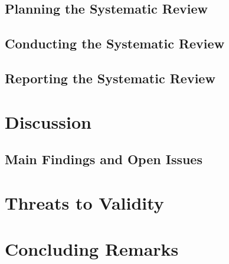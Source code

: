 \documentclass{llncs}
\begin{document}

	\subsection{Planning the Systematic Review}\label{planning}
	
	\subsection{Conducting the Systematic Review}\label{conducting}
	
	\subsection{Reporting the Systematic Review}\label{reporting}
	

\section{Discussion}\label{sec:discussion_and_threats}
	

\subsection{Main Findings and Open Issues}\label{sec:principle_findings}
	

\section{Threats to Validity}\label{threats}
		


\section{Concluding Remarks}\label{conclusion}
		


\linespread{0.87}


\end{document}
